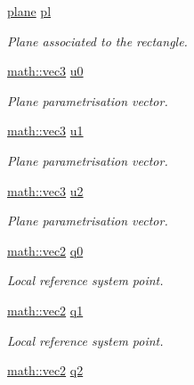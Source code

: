 \begin{DoxyCompactItemize}
\mbox{\label{classphysim_1_1geometry_1_1rectangle_ae31596ec13141a7dee676786f724f6e5}} 
\hyperlink{classphysim_1_1geometry_1_1plane}{plane} \hyperlink{classphysim_1_1geometry_1_1rectangle_ae31596ec13141a7dee676786f724f6e5}{pl}
\begin{DoxyCompactList}\small\item\em Plane associated to the rectangle. \end{DoxyCompactList}\item 
\hyperlink{structphysim_1_1math_1_1vec3}{math\+::vec3} \hyperlink{classphysim_1_1geometry_1_1rectangle_a96c2dad6c61e11d78b4d3bd8d0f1a0d9}{u0}
\begin{DoxyCompactList}\small\item\em Plane parametrisation vector. \end{DoxyCompactList}\item 
\hyperlink{structphysim_1_1math_1_1vec3}{math\+::vec3} \hyperlink{classphysim_1_1geometry_1_1rectangle_ac06c97e8c8d9a1f133d444bfd18b8325}{u1}
\begin{DoxyCompactList}\small\item\em Plane parametrisation vector. \end{DoxyCompactList}\item 
\hyperlink{structphysim_1_1math_1_1vec3}{math\+::vec3} \hyperlink{classphysim_1_1geometry_1_1rectangle_ac944360ddf607216343ada97e2135bdc}{u2}
\begin{DoxyCompactList}\small\item\em Plane parametrisation vector. \end{DoxyCompactList}\item 
\hyperlink{structphysim_1_1math_1_1vec2}{math\+::vec2} \hyperlink{classphysim_1_1geometry_1_1rectangle_ae3ad1641c3894851a112173d80a8fde5}{q0}
\begin{DoxyCompactList}\small\item\em Local reference system point. \end{DoxyCompactList}\item 
\hyperlink{structphysim_1_1math_1_1vec2}{math\+::vec2} \hyperlink{classphysim_1_1geometry_1_1rectangle_aaab2fc18296b16ccfdf9ac771709c525}{q1}
\begin{DoxyCompactList}\small\item\em Local reference system point. \end{DoxyCompactList}\item 
\hyperlink{structphysim_1_1math_1_1vec2}{math\+::vec2} \hyperlink{classphysim_1_1geometry_1_1rectangle_a5ab53161869ac5a6cc2154075ef24a53}{q2}

\end{DoxyCompactItemize}
